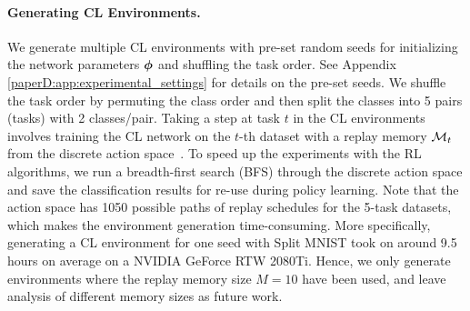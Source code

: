 \paragraph{Generating CL Environments.} We generate multiple CL environments with pre-set random seeds for initializing the network parameters ${\bm{\phi}}$ and shuffling the task order. See Appendix \ref{paperD:app:experimental_settings} for details on the pre-set seeds. 
We shuffle the task order by permuting the class order and then split the classes into 5 pairs (tasks) with 2 classes/pair. 
Taking a step at task $t$ in the CL environments involves training the CL network on the $t$-th dataset with a replay memory ${\mathcal{M}}_t$ from the discrete action space~. 
To speed up the experiments with the RL algorithms, we run a breadth-first search (BFS) through the discrete action space and save the classification results for re-use during policy learning. Note that the action space has 1050 possible paths of replay schedules for the 5-task datasets, which makes the environment generation time-consuming. More specifically, generating a CL environment for one seed with Split MNIST took on around 9.5 hours on average on a NVIDIA GeForce RTW 2080Ti.   
Hence, we only generate environments where the replay memory size $M=10$ have been used, and leave analysis of different memory sizes as future work. 



\begin{comment}
\vspace{-3mm}
\paragraph{DQN and A2C Architectures.}
The input layer has size $T-1$ where each unit is inputting the task performances since the states are represented by the validation accuracies $s_t = [A_{t, 1}^{(val)}, ..., A_{t, t}^{(val)}, 0, ..., 0]$. The current task can therefore be determined by the number of non-zero state inputs. The output layer has 35 units representing the possible actions at $T=5$ in the discrete action space (see Klasson \etal~\citeD{D:klasson2021learn}). We use action masking on the output units to prevent the network from selection invalid actions for constructing the replay memory at the current task. The DQN is a 2-layer MLP with 512 hidden units and ReLU activations. For A2C, we use separate networks for parameterizing the policy and the value function, where both networks are 2-layer MLPs with 64 hidden units of Tanh activations. 
\end{comment}

